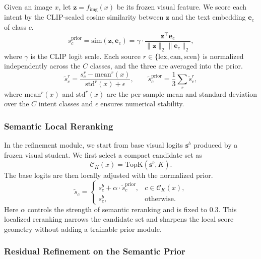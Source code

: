 Given an image $x$, let $\mathbf{z}=f_{\text{img}}(x)$ be its frozen visual feature. We score each intent by the CLIP-scaled cosine similarity between $\mathbf{z}$ and the text embedding $\mathbf{e}_c$ of class $c$.
\begin{equation}
s^{\text{prior}}_c = \text{sim}(\mathbf{z}, \mathbf{e}_c) = \gamma \cdot \frac{\mathbf{z}^\top \mathbf{e}_c}{\|\mathbf{z}\|_2 \|\mathbf{e}_c\|_2},
\end{equation}
where $\gamma$ is the CLIP logit scale. Each source $r \in \{\text{lex}, \text{can}, \text{scen}\}$ is normalized independently across the $C$ classes, and the three are averaged into the prior.
\begin{equation}
\tilde{s}^{r}_c = \frac{s^{r}_c - \mathrm{mean}^{r}(x)}{\mathrm{std}^{r}(x) + \epsilon},
\qquad
\tilde{s}^{\text{prior}}_c = \frac{1}{3}\sum_{r}\tilde{s}^{r}_c,
\end{equation}
where $\mathrm{mean}^{r}(x)$ and $\mathrm{std}^{r}(x)$ are the per-sample mean and standard deviation over the $C$ intent classes and $\epsilon$ ensures numerical stability.

\subsubsection{Semantic Local Reranking}

In the refinement module, we start from base visual logits $\mathbf{s}^{b}$ produced by a frozen visual student. We first select a compact candidate set as
\begin{equation}
\mathcal{C}_K(x) = \text{TopK}(\mathbf{s}^{b}, K).
\end{equation}
The base logits are then locally adjusted with the normalized prior.
\begin{equation}
\tilde{s}_c =
\begin{cases}
s^{b}_c + \alpha \cdot \tilde{s}^{\text{prior}}_c, & c \in \mathcal{C}_K(x), \\
s^{b}_c, & \text{otherwise}.
\end{cases}
\end{equation}
Here $\alpha$ controls the strength of semantic reranking and is fixed to $0.3$. This localized reranking narrows the candidate set and sharpens the local score geometry without adding a trainable prior module.

\subsubsection{Residual Refinement on the Semantic Prior}

